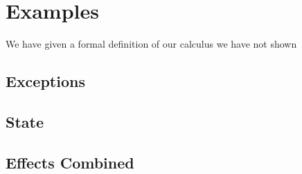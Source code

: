 \chapter{Examples}

We have given a formal definition of our calculus we have not shown 

\section{Exceptions}


\section{State}


\section{Effects Combined}


